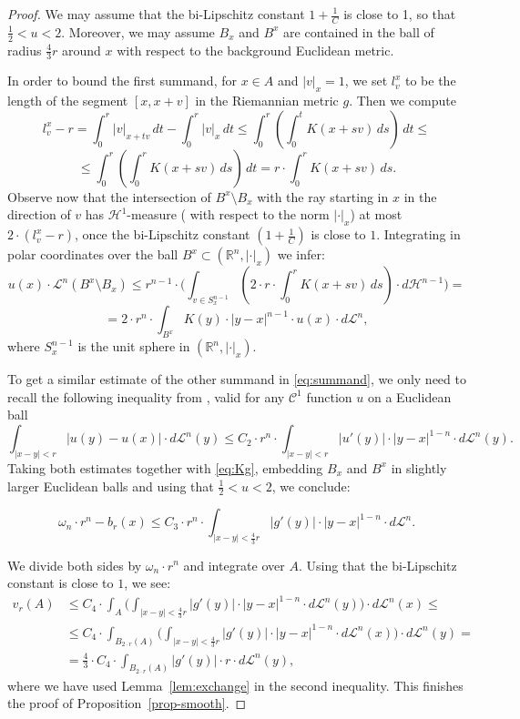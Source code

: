 \documentclass[12pt,leqno,intlimits]{amsart}
\numberwithin{equation}{section}
\theoremstyle{definition}
\theoremstyle{remark}
\newcommand{\lref}[1]{Lemma~\ref{#1}}
\newcommand{\R}{\mathbb{R}}
\begin{document}
\begin{proof}
We may assume that the bi-Lipschitz constant $1+\frac 1 C$ is close to 1, so that $\frac 1 2 < u <2$. Moreover, we may assume $B_x$ and $B^x$ are contained in the ball of radius $\frac 4 3 r$ around $x$ with respect to the background Euclidean metric.

In order to bound the first summand, for $x\in A$ and $|v|_x=1$, we set $l^x_v$ to be the length of the segment $[x,x+v]$
in the Riemannian metric $g$. Then we compute
$$l_v ^x -r= \int _0 ^r |v|_{x+tv} \, dt - \int _0 ^r |v|_x \, dt \leq \int _0 ^r (\int _0 ^t K(x+sv) \, ds)\, dt \leq $$
$$\leq \int _0 ^r (\int _0 ^r K(x+sv) \, ds)\, dt = r\cdot \int _0 ^r K(x+sv) \, ds.$$
Observe now that the intersection of $B^x\setminus B_x$ with the ray starting in $x$ in the direction of $v$ has $\mathcal H^1$-measure
( with respect to the norm $|\cdot |_x$)
at most $2\cdot (l_v^x -r)$, once the bi-Lipschitz constant $(1+\frac 1 C)$ is close to $1$.
Integrating in polar coordinates over the ball $B^x\subset (\R^n, |\cdot|_x)$ we infer:
$$u(x)\cdot \mathcal L^n (B^x\setminus B_x) \leq r^{n-1} \cdot \Big (\int _{v\in S^{n-1} _x} ( 2\cdot r \cdot \int _0 ^r K(x+sv) \, ds)
\cdot d\mathcal H^{n-1} \Big ) =$$
$$=2{\cdot}r^n \cdot \int _{B^x} K(y) \cdot |y-x|^{n-1} \cdot u(x) \cdot d\mathcal L^n,$$
where $S^{n-1} _x$ is the unit sphere in $(\R^n, |\cdot|_x)$.

To get a similar estimate of the other summand in \eqref{eq:summand},
we only need to recall the following inequality from \cite[Lemma 4.1]{Evans}, valid for any $\mathcal C^1$ function $u$ on a Euclidean ball
\[
\int _{|x-y| < r} |u(y)-u(x)| \cdot d\mathcal L^n (y) \leq C_2\cdot r^{n}\cdot \int _{|x-y| < r}|u'(y)| \cdot |y-x| ^{1-n} \cdot d\mathcal L^n (y).
\]
Taking both estimates together with \eqref{eq:Kg}, embedding $B_x$ and $B^x$ in slightly larger Euclidean balls and using that $\frac 1 2 < u <2$, we conclude:

\[
\omega _n \cdot r^n - b_r (x) \leq C_3\cdot r^n \cdot \int _{|x-y|< \frac 4 3 r} |g'(y)| \cdot |y-x|^{1-n} \cdot d\mathcal L^n.
\]

We divide both sides by $\omega _n \cdot r^n$ and integrate over $A$. Using that the bi-Lipschitz constant is close to $1$, we see:
\begin{align*}
v_r (A) &\leq C_4\cdot \int _A \Big (\int _{|x-y|< \frac 4 3 r} |g'(y)| \cdot |y-x|^{1-n}\cdot d\mathcal L^n (y) \Big ) \cdot d\mathcal L^n (x) \leq
\\
&\leq C_4\cdot \int _{B_{2{\cdot}r} (A)} \Big ( \int _{|x-y|< \frac 4 3 r} |g'(y)| \cdot |y-x|^{1-n} \cdot d\mathcal L^n (x) \Big ) \cdot d\mathcal L^n (y) = 
\\
&= \frac 4 3\cdot  C_4\cdot \int _{B_{2{\cdot}r} (A)} |g'(y)| \cdot r \cdot d\mathcal L^n (y),
\end{align*}
where we have used \lref{lem:exchange} in the second inequality.
This finishes the proof of Proposition~\ref{prop-smooth}.
\end{proof}
\end{document}
